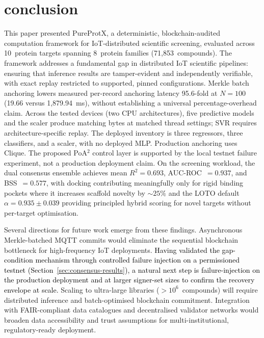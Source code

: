 \documentclass[conference]{IEEEtran}
\newcommand{\rev}[2]{#2}
\begin{document}
\section{\textbf{conclusion}}
\label{sec:conclusion}

This paper presented PureProtX, a deterministic,
blockchain-audited computation framework for IoT-distributed
scientific screening, evaluated across 10~protein targets
spanning 8~protein families (71{,}853~compounds).
The framework addresses a fundamental gap in distributed
IoT scientific pipelines: ensuring that inference results
\rev{R1.1}{are tamper-evident and independently verifiable, with exact replay restricted to supported, pinned configurations}.
\rev{R1.4, R2.2}{Merkle batch anchoring lowers measured
per-record anchoring latency 95.6-fold at $N{=}100$
(19.66 versus 1,879.94~ms), without establishing a universal
percentage-overhead claim.}
\rev{R1.1, R2.1}{Across the tested devices (two CPU architectures),
five predictive models and the scaler produce matching bytes
at matched thread settings; SVR requires architecture-specific
replay. The deployed inventory is three regressors, three
classifiers, and a scaler, with no deployed MLP.}
\rev{R1.2, R1.3, R2.4}{Production anchoring uses Clique.
The proposed PoA$^2$ control layer is supported by the local
testnet failure experiment, not a production deployment claim.} On the screening workload, the dual consensus ensemble
achieves mean $R^2{=}0.693$, AUC-ROC~$=0.937$, and
BSS~$=0.577$, with docking contributing meaningfully only
for rigid binding pockets where it increases scaffold
novelty by ${\sim}25\%$ and the LOTO default
$\alpha{=}0.935{\pm}0.039$ providing principled hybrid
scoring for novel targets without per-target optimisation.

Several directions for future work emerge from these
findings.
Asynchronous Merkle-batched MQTT commits would eliminate
the sequential blockchain bottleneck for high-frequency
IoT deployments.
\textcolor{black}{Having validated the gap-condition mechanism through
controlled failure injection on a permissioned testnet
(Section~\ref{sec:consensus-results}), a natural next step
is failure-injection on the production deployment and at
larger signer-set sizes to confirm the recovery envelope
at scale.}
Scaling to ultra-large libraries ($>10^6$~compounds) will
require distributed inference and batch-optimised
blockchain commitment.
Integration with FAIR-compliant data catalogues and
decentralised validator networks would broaden data
accessibility and trust assumptions for multi-institutional,
regulatory-ready deployment.
\end{document}
